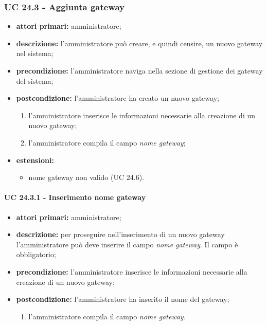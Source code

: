 			\subsubsection{UC 24.3 - Aggiunta gateway}
			\begin{itemize}
				\item \textbf{attori primari:} amministratore;
				\item \textbf{descrizione:} l'amministratore può creare, e quindi censire, un nuovo gateway nel sistema;
				\item \textbf{precondizione:} l'amministratore naviga nella sezione di gestione dei gateway del sistema;
				\item \textbf{postcondizione:} l'amministratore ha creato un nuovo gateway;
				\begin{enumerate}
					\item{l'amministratore inserisce le informazioni necessarie alla creazione di un nuovo gateway;}
					\item{l'amministratore compila il campo \textit{nome gateway};}
				\end{enumerate} 
				\item \textbf{estensioni:}
				\begin{itemize}
					\item nome gateway non valido (UC 24.6).
				\end{itemize}
				
			\end{itemize}
				\paragraph{UC 24.3.1 - Inserimento nome gateway}
					\begin{itemize}
						\item \textbf{attori primari:} amministratore;
						\item \textbf{descrizione:} per proseguire nell'inserimento di un nuovo gateway l'amministratore può deve inserire il campo \textit{nome gateway}. Il campo è obbligatorio;
						\item \textbf{precondizione:} l'amministratore inserisce le informazioni necessarie alla creazione di un nuovo gateway;
						\item \textbf{postcondizione:} l'amministratore ha inserito il nome del gateway;
						\begin{enumerate}
							\item{l'amministratore compila il campo \textit{nome gateway.}}
						\end{enumerate} 
					\end{itemize}

